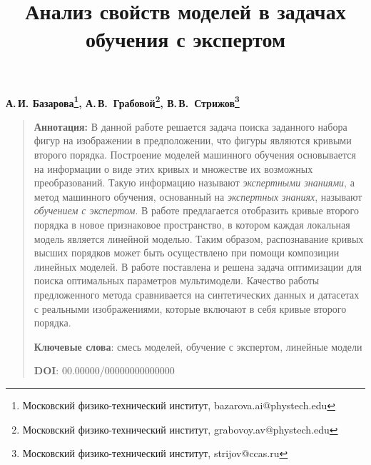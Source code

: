 \documentclass[12pt, twoside]{article}
\numberwithin{equation}{section}
\begin{document}
\title{\bf Анализ свойств моделей в задачах обучения с экспертом}
\date{}
\author{}
\maketitle

\begin{center}
\bf
А.\,И. Базарова\footnote{Московский физико-технический институт, bazarova.ai@phystech.edu}, А.\,В.~Грабовой\footnote{Московский физико-технический институт, grabovoy.av@phystech.edu}, В.\,В.~Стрижов\footnote{Московский физико-технический институт, strijov@ccas.ru}

\end{center}

{\centering\begin{quote}
\textbf{Аннотация:} В данной работе решается задача поиска заданного набора фигур на изображении в предположении, что фигуры являются кривыми второго порядка. Построение моделей машинного обучения основывается на информации о виде этих кривых и множестве их возможных преобразований. Такую информацию называют \textit{экспертными знаниями}, а метод машинного обучения, основанный на \textit{экспертных знаниях}, называют \textit{обучением с экспертом}.
    В работе предлагается отобразить кривые второго порядка в новое признаковое пространство, в котором каждая локальная модель является линейной моделью. Таким образом, распознавание кривых высших порядков может быть осуществлено при помощи композиции линейных моделей. В работе поставлена и решена задача оптимизации для поиска оптимальных параметров мультимодели.
    Качество работы предложенного метода сравнивается на синтетических данных и датасетах с реальными изображениями, которые включают в себя кривые второго порядка.
    
\smallskip
\textbf{Ключевые слова}: смесь моделей, обучение с экспертом, линейные модели

\smallskip
\textbf{DOI}: 00.00000/00000000000000
\end{quote}
}
\end{document}
